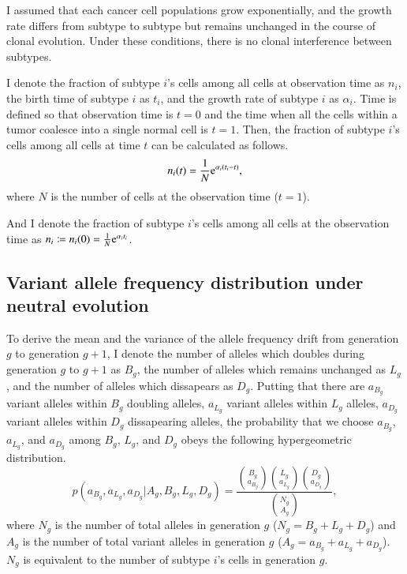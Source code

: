 \documentclass{article}
\begin{document}
I assumed that each cancer cell populations grow exponentially, and the growth rate differs from subtype to subtype but remains unchanged in the course of clonal evolution. Under these conditions, there is no clonal interference between subtypes.

I denote the fraction of subtype $i$'s cells among all cells at observation time as $n_i$, the birth time of subtype $i$ as $t_i$, and the growth rate of subtype $i$ as $\alpha_i$.
Time is defined so that observation time is $t=0$ and the time when all the cells within a tumor coalesce into a single normal cell is $t=1$.
Then, the fraction of subtype $i$'s cells among all cells at time $t$ can be calculated as follows.
\begin{equation}
 n_i(t) = \frac{1}{N}\mathrm{e}^{\alpha_i (t_i - t)},
\end{equation}
where $N$ is the number of cells at the observation time ($t=1$).

And I denote the fraction of subtype $i$'s cells among all cells at the observation time as $n_i \coloneqq n_i(0) = \frac{1}{N}\mathrm{e}^{\alpha_i t_i}$.

\subsection{Variant allele frequency distribution under neutral evolution}
To derive the mean and the variance of the allele frequency drift from generation $g$ to generation $g+1$, I denote the number of alleles which doubles during generation $g$ to $g+1$ as $B_g$, the number of alleles which remains unchanged as $L_g$, and the number of alleles which dissapears as $D_g$. Putting that there are $a_{B_g}$ variant alleles within $B_g$ doubling alleles, $a_{L_g}$ variant alleles within $L_g$ alleles, $a_{D_g}$ variant alleles within $D_g$ dissapearing alleles, the probability that we choose $a_{B_g}$, $a_{L_g}$, and $a_{D_g}$ among $B_g$, $L_g$, and $D_g$ obeys the following hypergeometric distribution.
\begin{equation}
 p(a_{B_g}, a_{L_g}, a_{D_g} | A_g, B_g, L_g, D_g) = \frac{{B_g \choose a_{B_g}}{L_g \choose a_{L_g}}{D_g \choose a_{D_g}}}{{N_g \choose A_g}},
\end{equation}
where $N_g$ is the number of total alleles in generation $g$ ($N_g = B_g + L_g + D_g$) and $A_g$ is the number of total variant alleles in generation $g$ ($A_g = a_{B_g} + a_{L_g} + a_{D_g}$).
$N_g$ is equivalent to the number of subtype $i$'s cells in generation $g$.
\end{document}
